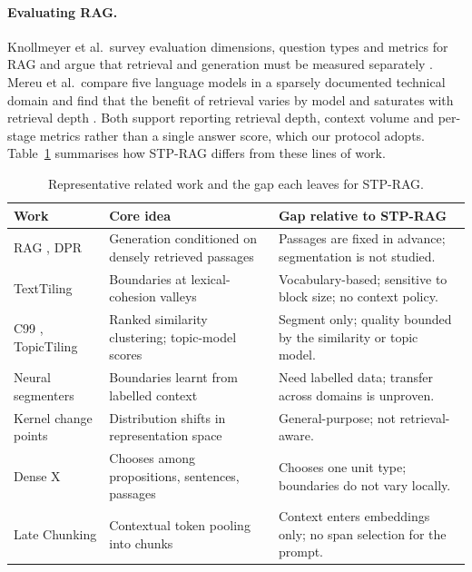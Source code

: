 \documentclass[10pt,a4paper]{article}
\begin{document}
\paragraph{Evaluating RAG.} Knollmeyer et al.\ survey evaluation dimensions, question types and metrics for RAG and argue that retrieval and generation must be measured separately \cite{knollmeyer2026evaluation}. Mereu et al.\ compare five language models in a sparsely documented technical domain and find that the benefit of retrieval varies by model and saturates with retrieval depth \cite{mereu2026specializing}. Both support reporting retrieval depth, context volume and per-stage metrics rather than a single answer score, which our protocol adopts. Table~\ref{tab:related} summarises how STP-RAG differs from these lines of work.

\begin{table}[!htbp]
\caption{Representative related work and the gap each leaves for STP-RAG.}
\label{tab:related}
\centering
\footnotesize
\setlength{\tabcolsep}{4pt}
\renewcommand{\arraystretch}{1.08}
\begin{tabularx}{\textwidth}{@{}>{\raggedright\arraybackslash}p{}>{\raggedright\arraybackslash}p{}>{\raggedright\arraybackslash}X@{}}
\toprule
Work & Core idea & Gap relative to STP-RAG \\
\midrule
RAG \cite{lewis2020rag}, DPR \cite{karpukhin2020dpr} & Generation conditioned on densely retrieved passages & Passages are fixed in advance; segmentation is not studied. \\
TextTiling \cite{hearst1997texttiling} & Boundaries at lexical-cohesion valleys & Vocabulary-based; sensitive to block size; no context policy. \\
C99 \cite{choi2000c99}, TopicTiling \cite{riedl2012topictiling} & Ranked similarity clustering; topic-model scores & Segment only; quality bounded by the similarity or topic model. \\
Neural segmenters \cite{koshorek2018textseg,lo2021transformer2} & Boundaries learnt from labelled context & Need labelled data; transfer across domains is unproven. \\
Kernel change points \cite{arlot2019kernelchangepoint} & Distribution shifts in representation space & General-purpose; not retrieval-aware. \\
Dense X \cite{chen2024densex} & Chooses among propositions, sentences, passages & Chooses one unit type; boundaries do not vary locally. \\
Late Chunking \cite{gunther2024latechunking} & Contextual token pooling into chunks & Context enters embeddings only; no span selection for the prompt. \\

\end{tabularx}
\end{table}
\end{document}

